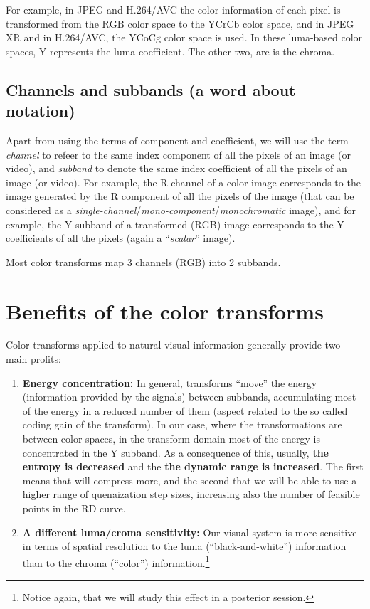 For example, in JPEG and H.264/AVC the color information of each pixel
is transformed from the $\text{RGB}$ color space to the $\text{YCrCb}$
color space, and in JPEG XR and in H.264/AVC, the $\text{YCoCg}$ color
space is used. In these luma-based color spaces, $\text{Y}$ represents
the luma coefficient. The other two, are is the chroma.

\subsection*{Channels and subbands (a word about notation)}

Apart from using the terms of component and coefficient, we will use
the term \emph{channel} to refeer to the same index component of all
the pixels of an image (or video), and \emph{subband} to denote the
same index coefficient of all the pixels of an image (or video). For
example, the $\text{R}$ channel of a color image corresponds to the
image generated by the $\text{R}$ component of all the pixels of the
image (that can be considered as a
\emph{single-channel}/\emph{mono-component}/\emph{monochromatic}
image), and for example, the $\text{Y}$ subband of a transformed
($\text{RGB}$) image corresponds to the $\text{Y}$ coefficients of
all the pixels (again a ``\emph{scalar}'' image).

Most color transforms map 3 channels ($\text{RGB}$) into 2 subbands.

\section{Benefits of the color transforms}

Color transforms applied to natural visual information generally
provide two main profits:
\begin{enumerate}
\item \textbf{Energy concentration:} In general, transforms ``move''
  the energy (information provided by the signals) between subbands,
  accumulating most of the energy in a reduced number of them (aspect
  related to the so called coding gain of the transform). In our case,
  where the transformations are between color spaces, in the transform
  domain most of the energy is concentrated in the $\text{Y}$
  subband. As a consequence of this, usually, \textbf{the entropy is
    decreased} and the \textbf{the dynamic range is increased}. The
  first means that will compress more, and the second that we will be
  able to use a higher range of quenaization step sizes, increasing
  also the number of feasible points in the RD curve.
\item \textbf{A different luma/croma sensitivity:} Our visual system
  is more sensitive in terms of spatial resolution to the luma
  (``black-and-white'') information than to the chroma
  (``color'') information.\footnote{Notice again, that we will study
  this effect in a posterior session.}
\end{enumerate}

